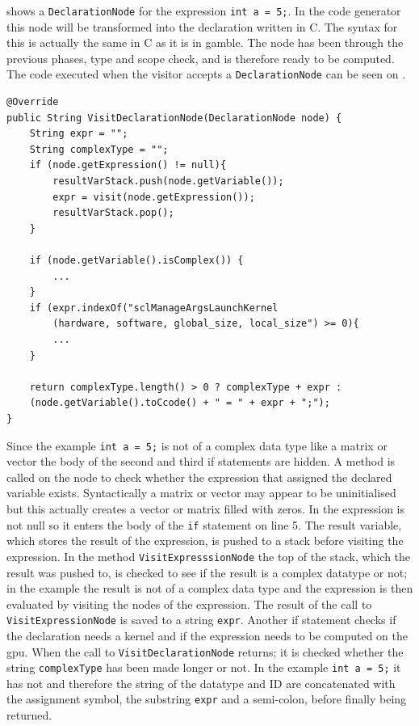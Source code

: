  shows a \texttt{DeclarationNode} for the expression \texttt{int a = 5;}. 
In the code generator this node will be transformed into the declaration written in C. 
The syntax for this is actually the same in C as it is in \gls{gamble}. 
The node has been through the previous phases, type and scope check, and is therefore ready to be computed. 
The code executed when the visitor accepts a \texttt{DeclarationNode} can be seen on .
\begin{lstlisting}[float, floatplacement=H!, caption=The visit method for visiting a DeclarationNode in the code generator. ,frame=tlrb,label={lst:DeclarationNodeCodeGen}]
@Override
public String VisitDeclarationNode(DeclarationNode node) {
    String expr = "";
    String complexType = "";
    if (node.getExpression() != null){
        resultVarStack.push(node.getVariable());
        expr = visit(node.getExpression());
        resultVarStack.pop();
    }

    if (node.getVariable().isComplex()) {
        ...
    }
    if (expr.indexOf("sclManageArgsLaunchKernel
    	(hardware, software, global_size, local_size") >= 0){
        ...
    }
    
    return complexType.length() > 0 ? complexType + expr : 
    (node.getVariable().toCcode() + " = " + expr + ";");
}
\end{lstlisting}
Since the example \texttt{int a = 5;} is not of a complex data type like a matrix or vector the body of the second and third if statements are hidden.
A method is called on the node to check whether the expression that assigned the declared variable exists. 
Syntactically a matrix or vector may appear to be uninitialised but this actually creates a vector or matrix filled with zeros. 
In  the expression is not null so it enters the body of the \texttt{if} statement on line 5.
The result variable, which stores the result of the expression, is pushed to a stack before visiting the expression.
In the method \texttt{VisitExpresssionNode} the top of the stack, which the result was pushed to, is checked to see if the result is a complex datatype or not; in the example the result is not of a complex data type and the expression is then evaluated by visiting the nodes of the expression.
The result of the call to \texttt{VisitExpressionNode} is saved to a string \texttt{expr}.
Another if statement checks if the declaration needs a kernel and if the expression needs to be computed on the \acrshort{gpu}.
When the call to \texttt{VisitDeclarationNode} returns; it is checked whether the string \texttt{complexType} has been made longer or not.
In the example \texttt{int a = 5;} it has not and therefore the string of the datatype and ID are concatenated with the assignment symbol, the substring \texttt{expr} and a semi-colon, before finally being returned.
